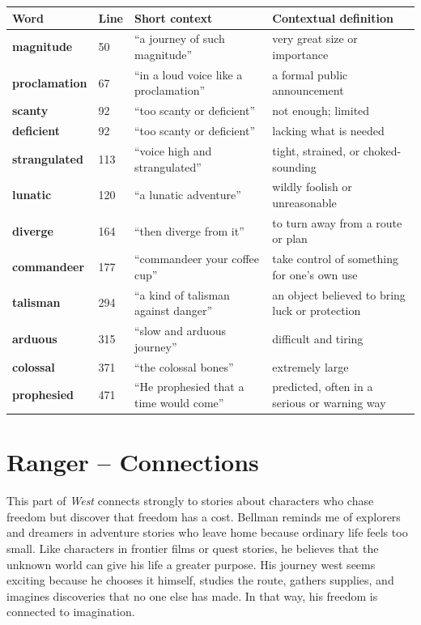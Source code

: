 \documentclass[11pt,a4paper]{article}
\begin{document}
\small
\begin{tabularx}{\textwidth}{>{\bfseries}p{2.5cm}p{1.2cm}X X}
\toprule
Word & Line & Short context & Contextual definition \\
\midrule
magnitude & 50 & ``a journey of such magnitude'' & very great size or importance \\
proclamation & 67 & ``in a loud voice like a proclamation'' & a formal public announcement \\
scanty & 92 & ``too scanty or deficient'' & not enough; limited \\
deficient & 92 & ``too scanty or deficient'' & lacking what is needed \\
strangulated & 113 & ``voice high and strangulated'' & tight, strained, or choked-sounding \\
lunatic & 120 & ``a lunatic adventure'' & wildly foolish or unreasonable \\
diverge & 164 & ``then diverge from it'' & to turn away from a route or plan \\
commandeer & 177 & ``commandeer your coffee cup'' & take control of something for one's own use \\
talisman & 294 & ``a kind of talisman against danger'' & an object believed to bring luck or protection \\
arduous & 315 & ``slow and arduous journey'' & difficult and tiring \\
colossal & 371 & ``the colossal bones'' & extremely large \\
prophesied & 471 & ``He prophesied that a time would come'' & predicted, often in a serious or warning way \\
\bottomrule
\end{tabularx}
\normalsize

\newpage

\section{Ranger -- Connections}

This part of \textit{West} connects strongly to stories about characters who chase freedom but discover that freedom has a cost. Bellman reminds me of explorers and dreamers in adventure stories who leave home because ordinary life feels too small. Like characters in frontier films or quest stories, he believes that the unknown world can give his life a greater purpose. His journey west seems exciting because he chooses it himself, studies the route, gathers supplies, and imagines discoveries that no one else has made. In that way, his freedom is connected to imagination.
\end{document}
